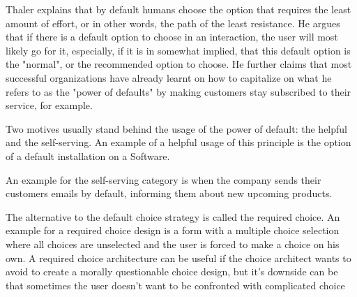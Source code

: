 
Thaler explains that by default humans choose the option that requires the least amount of effort, or in other words, the path of the least resistance. He argues that if there is a default option to choose in an interaction, the user will most likely go for it, especially, if it is in somewhat implied, that this default option is the "normal", or the recommended option to choose. He further claims that most successful organizations have already learnt on how to capitalize on what he refers to as the "power of defaults" by making customers stay subscribed to their service, for example.

 Two motives usually stand behind the usage of the power of default: the helpful and the self-serving.
 An example of a helpful usage of this principle is the option of a default installation on a Software.

 An example for the self-serving category is when the company sends their customers emails by default, informing them about new upcoming products.

The alternative to the default choice strategy is called the required choice.
An example for a required choice design is a form with a multiple choice selection where all choices are unselected and the user is forced to make a choice on his own.
A required choice architecture can be useful if the choice architect wants to avoid to create a morally questionable choice design, but it's downside can be that sometimes the user doesn't want to be confronted with complicated choice
 \~\cite[ch. 1.5, p.3-6]{Thaler2008}
